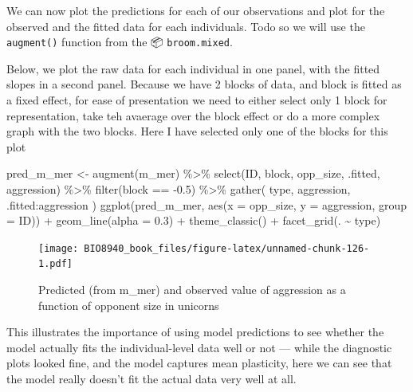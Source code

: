 \documentclass[
  12pt,
]{book}
\newenvironment{Shaded}{\begin{snugshade}}{\end{snugshade}}
\newcommand{\AttributeTok}[1]{\textcolor[rgb]{0.77,0.63,0.00}{#1}}
\newcommand{\FloatTok}[1]{\textcolor[rgb]{0.00,0.00,0.81}{#1}}
\newcommand{\FunctionTok}[1]{\textcolor[rgb]{0.00,0.00,0.00}{#1}}
\newcommand{\NormalTok}[1]{#1}
\newcommand{\OtherTok}[1]{\textcolor[rgb]{0.56,0.35,0.01}{#1}}
\newcommand{\SpecialCharTok}[1]{\textcolor[rgb]{0.00,0.00,0.00}{#1}}
\newcommand{\StringTok}[1]{\textcolor[rgb]{0.31,0.60,0.02}{#1}}
\begin{document}
We can now plot the predictions for each of our observations and plot for the observed and the fitted data for each individuals. Todo so we will use the \texttt{augment()} function from the 📦 \texttt{broom.mixed}.

Below, we plot the raw data for each individual in one panel, with the fitted slopes in a second panel. Because
we have 2 blocks of data, and block is fitted as a fixed effect, for ease of presentation we need to either select only 1 block for representation, take teh avaerage over the block effect or do a more complex graph with the two blocks. Here I have selected only one of the blocks for this plot

\begin{Shaded}
\begin{Highlighting}[]
\NormalTok{pred\_m\_mer }\OtherTok{\textless{}{-}} \FunctionTok{augment}\NormalTok{(m\_mer) }\SpecialCharTok{\%\textgreater{}\%}
  \FunctionTok{select}\NormalTok{(ID, block, opp\_size, .fitted, aggression) }\SpecialCharTok{\%\textgreater{}\%}
  \FunctionTok{filter}\NormalTok{(block }\SpecialCharTok{==} \SpecialCharTok{{-}}\FloatTok{0.5}\NormalTok{) }\SpecialCharTok{\%\textgreater{}\%}
  \FunctionTok{gather}\NormalTok{(}
\NormalTok{    type, aggression,}
    \StringTok{\textasciigrave{}}\AttributeTok{.fitted}\StringTok{\textasciigrave{}}\SpecialCharTok{:}\NormalTok{aggression}
\NormalTok{  )}
\FunctionTok{ggplot}\NormalTok{(pred\_m\_mer, }\FunctionTok{aes}\NormalTok{(}\AttributeTok{x =}\NormalTok{ opp\_size, }\AttributeTok{y =}\NormalTok{ aggression, }\AttributeTok{group =}\NormalTok{ ID)) }\SpecialCharTok{+}
  \FunctionTok{geom\_line}\NormalTok{(}\AttributeTok{alpha =} \FloatTok{0.3}\NormalTok{) }\SpecialCharTok{+}
  \FunctionTok{theme\_classic}\NormalTok{() }\SpecialCharTok{+}
  \FunctionTok{facet\_grid}\NormalTok{(. }\SpecialCharTok{\textasciitilde{}}\NormalTok{ type)}
\end{Highlighting}
\end{Shaded}

\begin{figure}
\centering
\texttt{[image: BIO8940\_book\_files/figure-latex/unnamed-chunk-126-1.pdf]}
\caption{\label{fig:unnamed-chunk-126}Predicted (from m\_mer) and observed value of aggression as a function of opponent size in unicorns}
\end{figure}

This illustrates the importance of using model predictions to see whether the model actually fits the individual-level data well or not --- while the diagnostic plots looked fine, and the model captures mean plasticity, here we can see that the model really doesn't fit the actual data very well at all.
\end{document}
